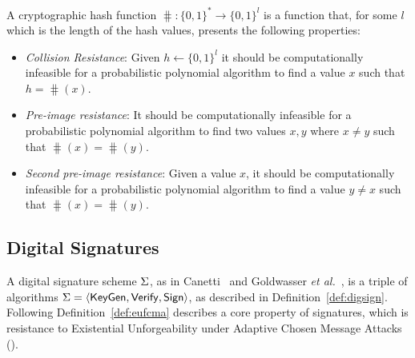 \begin{definition}\label{def:hash}
    A cryptographic hash function $\hash: \{0, 1\}^* \rightarrow \{0, 1\}^l$ is
    a function that, for some $l$ which is the length of the hash values,
    presents the following properties:
    \begin{itemize}
        \item \emph{Collision Resistance}:
            Given $h \leftarrow \{0, 1\}^l$ it should be computationally
            infeasible for a probabilistic polynomial algorithm to find a value
            $x$ such that $h = \hash(x)$.
        \item \emph{Pre-image resistance}:
            It should be computationally infeasible for a probabilistic
            polynomial algorithm to find two values $x, y$ where $x \neq y$
            such that $\hash(x) = \hash(y)$.
        \item \emph{Second pre-image resistance}:
            Given a value $x$, it should be computationally infeasible for a
            probabilistic polynomial algorithm to find a value $y \neq x$ such
            that $\hash(x) = \hash(y)$.
    \end{itemize}
\end{definition}

\subsection{Digital Signatures}\label{sec:secure_sig}

A digital signature scheme $\Sigma$, as in
Canetti~\cite{EPRINT:Canetti03} and Goldwasser \emph{et
al.}~\cite{C:GolMicRiv84}, is a triple of algorithms $\Sigma = \langle
\mathsf{KeyGen}, \mathsf{Verify}, \mathsf{Sign} \rangle$, as described in Definition~\ref{def:digsign}.
Following Definition~\ref{def:eufcma} describes a core property of signatures,
which is resistance to Existential Unforgeability under Adaptive Chosen Message
Attacks (\eufcma).

